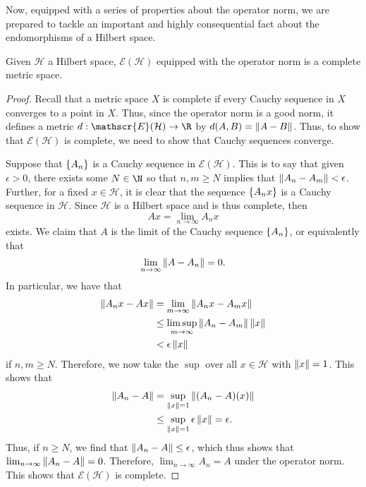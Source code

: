 Now, equipped with a series of properties about the operator norm, we are prepared to tackle an
important and highly consequential fact about the endomorphisms of a Hilbert space.
\begin{theorem}
    Given $\mathcal{H}$ a Hilbert space, $\mathscr{E}(\mathcal{H})$ equipped with the operator norm is a
    complete metric space.
\end{theorem}
\begin{proof}
    Recall that a metric space $X$ is complete if every Cauchy sequence in $X$ converges to a point in
    $X$. Thus, since the operator norm is a good norm, it defines a metric $d: \mathscr{E}(\mathcal{H})
    \to \R$ by $d(A,B) = \left\| A-B \right\|$. Thus, to show that $\mathscr{E}(\mathcal{H})$ is complete, we need
    to show that Cauchy sequences converge.

    Suppose that $\left\{ A_n \right\}$ is a Cauchy sequence in $\mathscr{E}(\mathcal{H})$. This is to say that
    given $\epsilon > 0$, there exists some $N \in \N$ so that $n, m \geq N$ implies that $\left\| A_n -
    A_m \right\| < \epsilon$. Further, for a fixed $x \in \mathcal{H}$, it is clear that the sequence
    $\left\{ A_nx \right\}$ is a Cauchy sequence in $\mathcal{H}$. Since $\mathcal{H}$ is a Hilbert space and is
    thus complete, then
    \[
        Ax = \lim_{n \to \infty} A_nx
    \]
    exists. We claim that $A$ is the limit of the Cauchy sequence $\left\{ A_n \right\}$, or equivalently that
    \[
        \lim_{n \to \infty} \left\| A - A_n \right\| = 0.  
    \]
    In particular, we have that
    \begin{align*}
        \left\| A_nx - Ax \right\| &= \lim_{m \to \infty} \left\| A_n x - A_m x \right\|\\
                         &\leq \limsup_{m \to \infty} \left\| A_n - A_m \right\| \left\| x \right\| \\
                         &< \epsilon \left\| x \right\|
    \end{align*}
    if $n,m \geq N$. Therefore, we now take the $\sup$ over all $x \in \mathcal{H}$ with $\left\| x \right\| = 1$.
    This shows that
    \begin{align*}
        \left\| A_n - A \right\| &= \sup_{\left\| x \right\| = 1} \left\| (A_n - A)(x) \right\| \\
                       &\leq \sup_{\left\| x \right\| = 1} \epsilon\left\| x \right\| = \epsilon.
    \end{align*}
    Thus, if $n \geq N$, we find that $\left\| A_n - A \right\| \leq \epsilon$, which thus shows that $\lim_{n \to
    \infty} \left\| A_n - A \right\| = 0$. Therefore, $\lim_{n \to \infty} A_n = A$ under the operator norm. This
    shows that $\mathscr{E}(\mathcal{H})$ is complete.
\end{proof}

